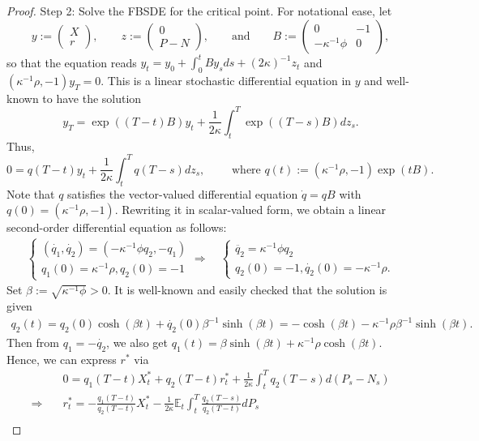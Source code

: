 \documentclass[openany,oneside]{article}
\theoremstyle{definition}
\theoremstyle{remark}
\newcommand{\E}{\mathbb{E}} %
\newcommand{\ts}{\textstyle}
\begin{document}
\begin{proof}
Step 2: Solve the FBSDE for the critical point. For notational ease, let
\[
 y:=\begin{pmatrix} X \\ r\end{pmatrix},\qquad z:=\begin{pmatrix} 0 \\ P-N\end{pmatrix},\qquad\text{and}\qquad B:=\begin{pmatrix} 0 & -1 \\ -\kappa^{-1}\phi & 0\end{pmatrix},
\]
so that the equation reads $y_t = y_0 + \int_0^t B y_s ds + (2\kappa)^{-1}z_t$ and $(\kappa^{-1}\rho, -1)y_T = 0$. This is a linear stochastic differential equation in $y$ and well-known to have the solution
\[
\ts y_T = \exp((T-t)B)y_t + \frac{1}{2\kappa} \int_t^T \exp((T-s)B) dz_s.
\]
Thus,
\[
\ts 0 = q(T-t)y_t + \frac{1}{2\kappa}\int_t^T q(T-s) dz_s,\qquad \textrm{ where } q(t):=(\kappa^{-1}\rho, -1)\exp(tB).
\]
Note that $q$ satisfies the vector-valued differential equation $\dot{q}=qB$ with $q(0)=(\kappa^{-1}\rho, -1)$. Rewriting it in scalar-valued form, we obtain a linear second-order differential equation as follows:
\begin{align*}
\begin{cases} (\dot{q_1},\dot{q_2})=(-\kappa^{-1}\phi q_2, -q_1) \\ q_1(0)=\kappa^{-1}\rho, q_2(0)=-1 \end{cases}
\Rightarrow\quad \begin{cases}
\ddot{q_2}=\kappa^{-1}\phi q_2 \\ q_2(0)=-1, \dot{q_2}(0)=-\kappa^{-1}\rho.
\end{cases}
\end{align*}
Set $\beta:=\sqrt{\kappa^{-1}\phi}>0$. It is well-known and easily checked that the solution is given%
\begin{align*}
q_2(t)=q_2(0)\cosh(\beta t)+\dot{q_2}(0)\beta^{-1}\sinh(\beta t) = -\cosh(\beta t)-\kappa^{-1}\rho\beta^{-1}\sinh(\beta t).
\end{align*}
Then from $q_1=-\dot{q_2}$, we also get $q_1(t)=\beta\sinh(\beta t)+\kappa^{-1}\rho\cosh(\beta t)$. Hence, we can express $r^\ast$ via
\begin{align*}
&\ts 0=q_1(T-t)X^\ast_t+q_2(T-t)r^\ast_t+\frac{1}{2\kappa}\int_t^T q_2(T-s) d(P_s-N_s) \\
\Rightarrow\quad &\ts r^\ast_t = -\frac{q_1(T-t)}{q_2(T-t)} X^\ast_t - \frac{1}{2\kappa} \E_t\int_t^T\frac{q_2(T-s)}{q_2(T-t)} dP_s \\

\end{align*}
\end{proof}
\end{document}
